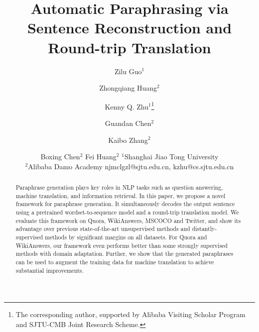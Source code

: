 \documentclass{article}
\title{Automatic Paraphrasing via Sentence Reconstruction and Round-trip Translation}
\author{
Zilu Guo$^1$
\and
Zhongqiang Huang$^2$\and
Kenny Q. Zhu$^1$\thanks{The corresponding author, supported by Alibaba Visiting Scholar Program and SJTU-CMB Joint Research Scheme.}\and
Guandan Chen$^2$\and
Kaibo Zhang$^2$\and
Boxing Chen$^2$\And
Fei Huang$^2$
\affiliations
$^1$Shanghai Jiao Tong University\\
$^2$Alibaba Damo Academy
\emails
njmclgzl@sjtu.edu.cn,
kzhu@cs.sjtu.edu.cn
}
\begin{document}
\maketitle

\begin{abstract}
Paraphrase generation plays key roles in NLP tasks such as question answering, machine translation, and information retrieval. In this paper, we propose a novel framework for paraphrase generation. It simultaneously decodes the output sentence using a pretrained wordset-to-sequence model and a round-trip translation model. We evaluate this framework on Quora, WikiAnswers, MSCOCO and Twitter, and show its advantage over previous state-of-the-art unsupervised methods and distantly-supervised methods by significant margins on all datasets. For Quora and WikiAnswers, our framework even performs better than some strongly supervised methods with domain adaptation. Further, we show that the generated paraphrases can be used to augment the training data for machine translation to achieve substantial improvements.
\end{abstract}










\end{document}
